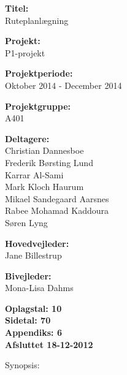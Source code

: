 \begin{minipage}[t]{0.48\textwidth}
\textbf{Titel:} \\[5pt]\bigskip\hspace{2ex}
Ruteplanlægning

\textbf{Projekt:} \\[5pt]\bigskip\hspace{2ex}
P1-projekt

\textbf{Projektperiode:} \\[5pt]\bigskip\hspace{2ex}
Oktober 2014 - December 2014

\textbf{Projektgruppe:} \\[5pt]\bigskip\hspace{2ex}
A401	

\textbf{Deltagere:} \\[5pt]\hspace*{2ex}
Christian Dannesboe \\\hspace*{2ex}
Frederik Børsting Lund \\\hspace*{2ex}
Karrar Al-Sami \\\hspace*{2ex}
Mark Kloch Haurum \\\hspace*{2ex}
Mikael Sandegaard Aarsnes \\\hspace*{2ex}
Rabee Mohamad Kaddoura \\\bigskip\hspace{2ex}
Søren Lyng

\textbf{Hovedvejleder:} \\[5pt]\hspace*{2ex}
Jane Billestrup \\\bigskip\hspace{2ex}

\textbf{Bivejleder:} \\[5pt]\hspace*{2ex}
Mona-Lisa Dahms \\\bigskip\hspace{2ex}
\vspace*{1cm}

\textbf{Oplagstal: 10} \\
\textbf{Sidetal: 70} \\
\textbf{Appendiks: 6} \\ 
\textbf{Afsluttet 18-12-2012}

\end{minipage}
\hfill
\begin{minipage}[t]{0.483\textwidth}
Synopsis: \\[5pt]
\fbox{\parbox{7cm}{\bigskip\bigskip}}
\end{minipage}

